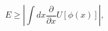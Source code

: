 \begin{equation}
\label{Ebogo}
E\geq\left|\int dx\frac{\partial}{\partial x}U[\phi(x)]\right|,
\end{equation}


